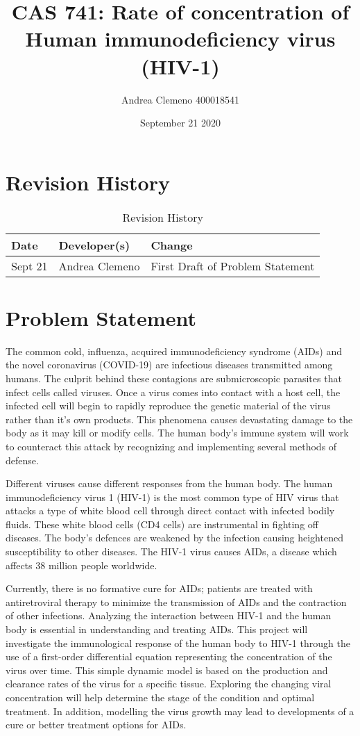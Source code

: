 \documentclass{article}
\title{CAS 741: Rate of concentration of Human immunodeficiency virus (HIV-1)}
\author{ Andrea Clemeno   400018541 }
\date{September 21 2020}
\begin{document}
\maketitle

\newpage
\section{Revision History}

\begin{table}[hp]
\caption{Revision History} \label{TblRevisionHistory}
\begin{tabularx}{\textwidth}{llX}
\toprule
\textbf{Date} & \textbf{Developer(s)} & \textbf{Change}\\
\midrule
Sept 21 & Andrea Clemeno & First Draft of Problem Statement\\


\bottomrule
\end{tabularx}
\end{table}

\newpage
\section{Problem Statement}

The common cold, influenza, acquired immunodeficiency syndrome (AIDs) and the novel coronavirus (COVID-19) are infectious diseases transmitted among humans. The culprit behind these contagions are submicroscopic parasites that infect cells called viruses. Once a virus comes into contact with a host cell, the infected cell will begin to rapidly reproduce the genetic material of the virus rather than it’s own products. This phenomena causes devastating damage to the body as it may kill or modify cells. The human body’s immune system will work to counteract this attack by recognizing and implementing several methods of defense. 

Different viruses cause different responses from the human body. The human immunodeficiency virus 1 (HIV-1) is the most common type of HIV virus that attacks a type of white blood cell through direct contact with infected bodily fluids. These white blood cells (CD4 cells) are instrumental in fighting off diseases. The body’s defences are weakened by the infection causing heightened susceptibility to other diseases. The HIV-1 virus causes AIDs, a disease which affects 38 million people worldwide. 

Currently, there is no formative cure for AIDs; patients are treated with antiretroviral therapy to minimize the transmission of AIDs and the contraction of other infections. Analyzing the interaction between HIV-1 and the human body is essential in understanding and treating AIDs. This project will investigate the immunological response of the human body to HIV-1 through the use of a first-order differential equation representing the concentration of the virus over time. This simple dynamic model is based on the production and clearance rates of the virus for a specific tissue. Exploring the changing viral concentration will help determine the stage of the condition and optimal treatment. In addition, modelling the virus growth may lead to developments of a cure or better treatment options for AIDs.
\end{document}
